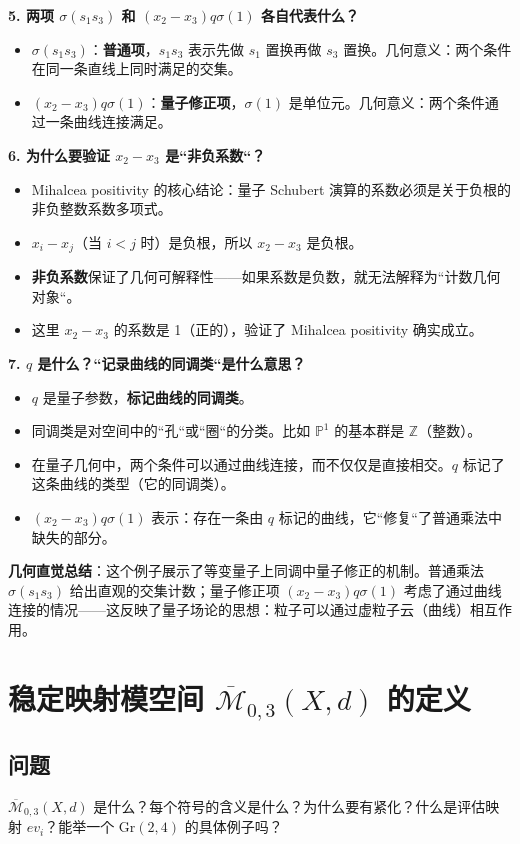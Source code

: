 \textbf{5. 两项 $\sigma(s_1 s_3)$ 和 $(x_2 - x_3) q \sigma(1)$ 各自代表什么？}
\begin{itemize}
\item $\sigma(s_1 s_3)$：\textbf{普通项}，$s_1 s_3$ 表示先做 $s_1$ 置换再做 $s_3$ 置换。几何意义：两个条件在同一条直线上同时满足的交集。
\item $(x_2 - x_3) q \sigma(1)$：\textbf{量子修正项}，$\sigma(1)$ 是单位元。几何意义：两个条件通过一条曲线连接满足。
\end{itemize}

\textbf{6. 为什么要验证 $x_2 - x_3$ 是``非负系数``？}
\begin{itemize}
\item Mihalcea positivity 的核心结论：量子 Schubert 演算的系数必须是关于负根的非负整数系数多项式。
\item $x_i - x_j$（当 $i < j$ 时）是负根，所以 $x_2 - x_3$ 是负根。
\item \textbf{非负系数}保证了几何可解释性——如果系数是负数，就无法解释为``计数几何对象``。
\item 这里 $x_2 - x_3$ 的系数是 1（正的），验证了 Mihalcea positivity 确实成立。
\end{itemize}

\textbf{7. $q$ 是什么？``记录曲线的同调类``是什么意思？}
\begin{itemize}
\item $q$ 是量子参数，\textbf{标记曲线的同调类}。
\item 同调类是对空间中的``孔``或``圈``的分类。比如 $\mathbb{P}^1$ 的基本群是 $\mathbb{Z}$（整数）。
\item 在量子几何中，两个条件可以通过曲线连接，而不仅仅是直接相交。$q$ 标记了这条曲线的类型（它的同调类）。
\item $(x_2 - x_3) q \sigma(1)$ 表示：存在一条由 $q$ 标记的曲线，它``修复``了普通乘法中缺失的部分。
\end{itemize}

\textbf{几何直觉总结}：这个例子展示了等变量子上同调中量子修正的机制。普通乘法 $\sigma(s_1 s_3)$ 给出直观的交集计数；量子修正项 $(x_2 - x_3) q \sigma(1)$ 考虑了通过曲线连接的情况——这反映了量子场论的思想：粒子可以通过虚粒子云（曲线）相互作用。
\section{稳定映射模空间 $\overline{\mathcal{M}}_{0,3}(X,d)$ 的定义}\label{sec:MOD-space}
\subsection{问题}
$\overline{\mathcal{M}}_{0,3}(X,d)$ 是什么？每个符号的含义是什么？为什么要有紧化？什么是评估映射 $ev_i$？能举一个 $\mathrm{Gr}(2,4)$ 的具体例子吗？

